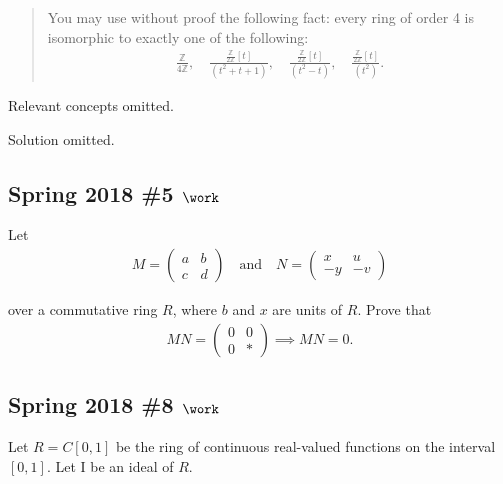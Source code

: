 \begin{quote}
You may use without proof the following fact: every ring of order 4 is
isomorphic to exactly one of the following:
\begin{align*}
\frac{ {\mathbb{Z}}}{ 4{\mathbb{Z}}}, \quad
\frac{ \frac{  {\mathbb{Z}}}{ 2{\mathbb{Z}}} [t]}{(t^2 + t + 1)}, \quad
\frac{ \frac{ {\mathbb{Z}}}{ 2{\mathbb{Z}}} [t]}{ (t^2 - t)}, \quad
\frac{ \frac{ {\mathbb{Z}}}{2{\mathbb{Z}}}[t]}{(t^2 )}
.\end{align*}
\end{quote}

Relevant concepts omitted.

Solution omitted.

\hypertarget{spring-2018-5-work}{%
\subsection{\texorpdfstring{Spring 2018 \#5
\(\work\)}{Spring 2018 \#5 \textbackslash work}}\label{spring-2018-5-work}}

Let
\begin{align*}
M=\left(\begin{array}{ll}{a} & {b} \\ {c} & {d}\end{array}\right)
\quad \text{and} \quad 
N=\left(\begin{array}{cc}{x} & {u} \\ {-y} & {-v}\end{array}\right)
\end{align*}

over a commutative ring \(R\), where \(b\) and \(x\) are units of \(R\).
Prove that
\begin{align*}
M N=\left(\begin{array}{ll}{0} & {0} \\ {0} & {*}\end{array}\right)
\implies MN = 0
.\end{align*}

\hypertarget{spring-2018-8-work}{%
\subsection{\texorpdfstring{Spring 2018 \#8
\(\work\)}{Spring 2018 \#8 \textbackslash work}}\label{spring-2018-8-work}}

Let \(R = C[0, 1]\) be the ring of continuous real-valued functions on
the interval \([0, 1]\). Let I be an ideal of \(R\).

